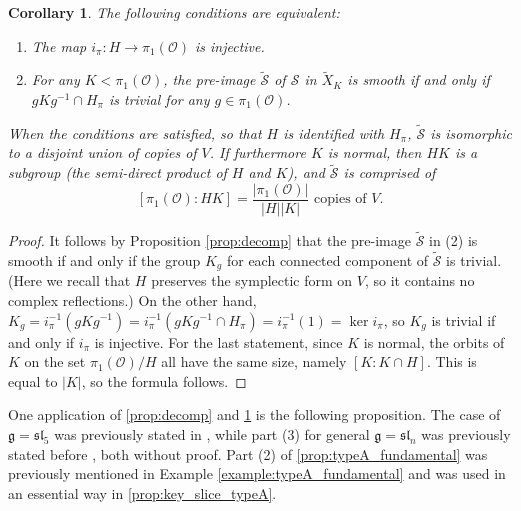 \documentclass{amsart}
\newtheorem{corollary}[theorem]{Corollary}
\theoremstyle{definition}
\newcommand{\cS}{\mathcal{S}}
\newcommand{\g}{\mathfrak{g}}
\newcommand{\0}{\mathcal{O}}
\begin{document}
\begin{corollary}\label{cor:H_injection}
	The following conditions are equivalent:
	\begin{enumerate}
		\item The map $i_\pi: H \to \pi_1(\0)$ is injective.

		\item For any $K < \pi_1(\0)$, the pre-image $\widetilde{\mathcal S}$ of $\cS$ in $\widetilde{X}_K$ is smooth if and only if $g K g^{-1} \cap H_\pi$ is trivial for any $g \in \pi_1(\0)$.
	\end{enumerate}
	When the conditions are satisfied, so that $H$ is identified with $H_\pi$, $\widetilde{\cS}$ is isomorphic to a disjoint union of copies of $V$.
    If furthermore $K$ is normal, then $HK$ is a subgroup (the semi-direct product of $H$ and $K$), and $\widetilde{\cS}$ is comprised of 
    $$[\pi_1(\0):HK] = \frac{|\pi_1(\0)|}{|H||K|} \text{ copies of } V. $$ 
\end{corollary}

\begin{proof}
	It follows by Proposition \ref{prop:decomp} that the pre-image $\widetilde{\cS}$ in (2) is smooth if and only if the group $K_g$ for each connected component of $\widetilde{\cS}$ is trivial. 
(Here we recall that $H$ preserves the symplectic form on $V$, so it contains no complex reflections.)
On the other hand, $K_g = i_\pi^{-1}(gK g^{-1}) = i_\pi^{-1}(gK g^{-1} \cap H_\pi) = i_\pi^{-1}(1) = \ker i_\pi$, so $K_g$ is trivial if and only if $i_\pi$ is injective. 
For the last statement, since $K$ is normal, the orbits of $K$ on the set $\pi_1(\0)/H$ all have the same size, namely $[K:K\cap H]$. This is equal to $|K|$, so the formula follows.
\end{proof}

One application of \cref{prop:decomp} and \cref{cor:H_injection} is the following proposition. The case of $\g=\mathfrak{sl}_5$ was previously stated in \cite[Proposition 12.9]{FJLS}, while part (3) for general $\g=\mathfrak{sl}_n$ was previously stated before \cite[Theorem 1.4]{BBFJLS}, both without proof. 
Part (2) of \cref{prop:typeA_fundamental} was previously mentioned in Example \ref{example:typeA_fundamental} and was used in an essential way in \cref{prop:key_slice_typeA}.
\end{document}
